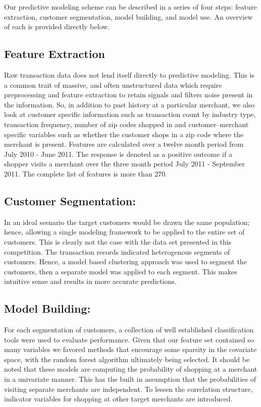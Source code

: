 \documentclass[12pt]{article} %
\begin{document}
Our predictive modeling scheme can be described in a series of four steps: feature extraction, customer segmentation, model building, and model use.  An overview of each is provided directly below.
\subsection*{Feature Extraction} 
Raw transaction data does not lend itself directly to predictive modeling.  This is a common trait of massive, and often unstructured data which require preprocessing and feature extraction to retain signals and filters noise present in the information.  So, in addition to past history at a particular merchant, we also look at customer specific information such as transaction count by industry type, transaction frequency, number of zip codes shopped in and customer--merchant specific variables such as whether the customer shops in a zip code where the merchant is present.  Features are calculated over a twelve month period from July 2010 - June 2011.  The response is denoted as a positive outcome if a shopper visits a merchant over the three month period July 2011 - September 2011.  The complete list of features is more than 270.  

\subsection*{Customer Segmentation:} 
In an ideal scenario the target customers would be drawn the same population; hence, allowing a single modeling framework to be applied to the entire set of customers.  This is clearly not the case with the data set presented in this competition.  The transaction records indicated  heterogenous segments of customers.  Hence, a model based clustering approach was used to segment the customers, then a separate model was applied to each segment.  This makes intuitive sense and results in more accurate predictions. 

\subsection*{Model Building:} 
For each segmentation of customers, a collection of well established classification tools were used to evaluate performance.  Given that our feature set contained so many variables we favored methods that encourage some sparsity in the covariate space, with the random forest algorithm ultimately being selected.  It should be noted that these models are computing the probability of shopping at a merchant in a univariate manner.  This has the built in assumption that the probabilities of visiting separate merchants are independent.  To lessen the correlation structure, indicator variables for shopping at other target merchants are introduced.
\end{document}
